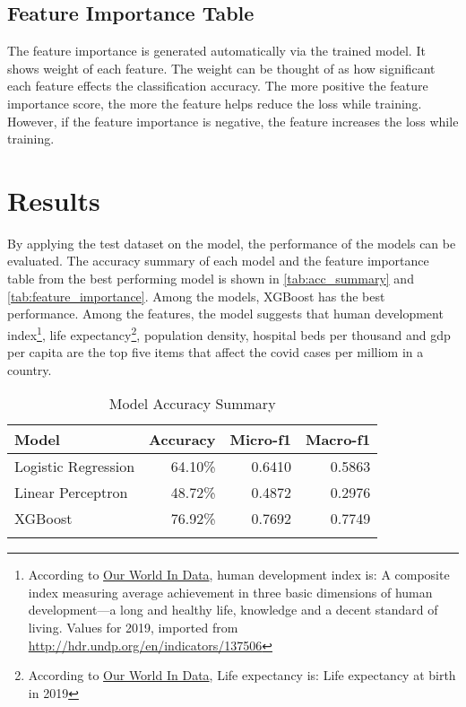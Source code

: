 \documentclass[10pt, a4paper, twocolumn]{article} %
\begin{document}
\subsection{Feature Importance Table}
The feature importance is generated automatically via the trained model. It shows weight of each feature. The weight can 
be thought of as how significant each feature effects the classification accuracy. The more positive the feature importance 
score, the more the feature helps reduce the loss while training. However, if the feature importance is negative, the feature 
increases the loss while training.
\section{Results}
By applying the test dataset on the model, the performance of the models can be evaluated. The accuracy summary of each 
model and the feature importance table from the best performing model is shown in \autoref{tab:acc_summary} and 
\autoref{tab:feature_importance}. Among the models, XGBoost has the best performance. Among the features, the model suggests 
that human development index\footnote{According to \href{https://github.com/owid/covid-19-data/tree/master/public/data}{Our World In Data}, 
human development index is: A composite index measuring average achievement in three basic dimensions of human 
development—a long and healthy life, knowledge and a decent standard of living. Values for 2019, imported from 
\url{http://hdr.undp.org/en/indicators/137506}}, life expectancy\footnote{According to 
\href{https://github.com/owid/covid-19-data/tree/master/public/data}{Our World In Data}, Life expectancy is: Life 
expectancy at birth in 2019}, population density, hospital beds per thousand 
and gdp per capita are the top five items that affect the covid cases per milliom in a country.
\begin{table}
	\caption{Model Accuracy Summary}
	\centering
	\begin{tabular}{lrrr}
		\toprule
		\textbf{Model} & \textbf{Accuracy} & \textbf{Micro-f1} & \textbf{Macro-f1} \\
		\midrule
		Logistic Regression & 64.10\% & 0.6410 & 0.5863 \\
		Linear Perceptron & 48.72\% & 0.4872 & 0.2976 \\
		XGBoost & 76.92\% & 0.7692 &0.7749 \\
		\bottomrule
	\label{tab:acc_summary}
	\end{tabular}
\end{table}
\end{document}

